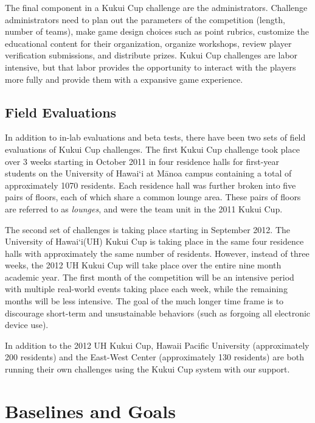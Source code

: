 \documentclass{sigchi}
\newcommand{\Hawaii}{Hawai`i\xspace}
\newcommand{\Manoa}{M\=anoa\xspace}
\begin{document}
The final component in a Kukui Cup challenge are the administrators. Challenge administrators need to plan out the parameters of the competition (length, number of teams), make game design choices such as point rubrics, customize the educational content for their organization, organize workshops, review player verification submissions, and distribute prizes. Kukui Cup challenges are labor intensive, but that labor provides the opportunity to interact with the players more fully and provide them with a expansive game experience.

\subsection{Field Evaluations}

In addition to in-lab evaluations and beta tests, there have been two sets of field evaluations of Kukui Cup challenges. The first Kukui Cup challenge took place over 3 weeks starting in October 2011 in four residence halls for first-year students on the University of \Hawaii at \Manoa campus containing a total of approximately 1070 residents. Each residence hall was further broken into five pairs of floors, each of which share a common lounge area. These pairs of floors are referred to as \emph{lounges}, and were the team unit in the 2011 Kukui Cup.

The second set of challenges is taking place starting in September 2012. The University of \Hawaii (UH) Kukui Cup is taking place in the same four residence halls with approximately the same number of residents. However, instead of three weeks, the 2012 UH Kukui Cup will take place over the entire nine month academic year. The first month of the competition will be an intensive period with multiple real-world events taking place each week, while the remaining months will be less intensive. The goal of the much longer time frame is to discourage short-term and unsustainable behaviors (such as forgoing all electronic device use). 

In addition to the 2012 UH Kukui Cup, Hawaii Pacific University (approximately 200 residents) and the East-West Center (approximately 130 residents) are both running their own challenges using the Kukui Cup system with our support.

\section{Baselines and Goals}
\label{sec:goals-baselines}
\end{document}
